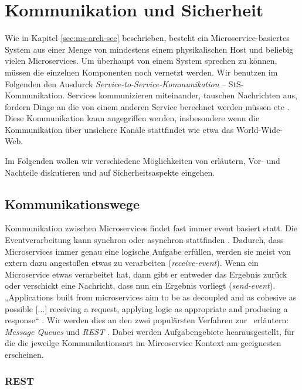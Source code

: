 \section{Kommunikation und Sicherheit}
\label{sec:kommunikation}

Wie in Kapitel \ref{sec:ms-arch-sec} beschrieben, besteht ein Microservice-basiertes System aus einer Menge von mindestens einem physikalischen Host und beliebig vielen Microservices. Um überhaupt von einem System sprechen zu können, müssen die einzelnen Komponenten noch vernetzt werden. Wir benutzen im Folgenden den Ausdurck \textit{Service-to-Service-Kommunikation} -- StS-Kommunikation. Services kommunizieren miteinander, tauschen Nachrichten aus, fordern Dinge an die von einem anderen Service berechnet werden müssen etc \cite{newman2015}. Diese Kommunikation kann angegriffen werden, insbesondere wenn die Kommunikation über unsichere Kanäle stattfindet wie etwa das World-Wide-Web.

Im Folgenden wollen wir verschiedene Möglichkeiten von \stscom erläutern, Vor- und Nachteile diskutieren und auf Sicherheitsaspekte eingehen.

\subsection{Kommunikationswege}

Kommunikation zwischen Microservices findet fast immer event basiert statt. Die Eventverarbeitung kann synchron oder asynchron stattfinden \cite{newman2015}. Dadurch, dass Microservices immer genau eine logische Aufgabe erfüllen, werden sie meist von extern dazu angestoßen etwas zu verarbeiten (\textit{receive-event}). Wenn ein Microservice etwas verarbeitet hat, dann gibt er entweder das Ergebnis zurück oder verschickt eine Nachricht, dass nun ein Ergebnis vorliegt (\textit{send-event}). „Applications built from microservices aim to be as decoupled and as cohesive as possible [...] receiving a request, applying logic as appropriate and producing a response“ \cite{Fowler+14}. Wir werden dies an den zwei populärsten Verfahren zur \stscom\ erläutern: \textit{Message Queues} und \textit{REST} \cite{Fowler+14,newman2015}. Dabei werden Aufgabengebiete hearausgestellt, für die die jeweilge Kommunikationsart im Mircoservice Kontext am geeignesten erscheinen.

\subsubsection{REST}

